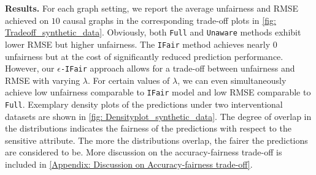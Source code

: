 \documentclass{article} %
\begin{document}
\textbf{Results.} For each graph setting, we report the average unfairness and RMSE achieved on $10$ causal graphs %
in the corresponding trade-off plots in \cref{fig: Tradeoff_synthetic_data}. Obviously, both \texttt{Full} and \texttt{Unaware} methods exhibit lower RMSE but higher unfairness. The \texttt{IFair} method achieves nearly 0 unfairness but at the cost of significantly reduced prediction performance. However, our \texttt{$\epsilon$-IFair} approach allows for a trade-off between unfairness and RMSE with varying $\lambda$. For certain values of $\lambda$, we can even simultaneously achieve low unfairness comparable to \texttt{IFair} model and low RMSE comparable to \texttt{Full}.
Exemplary density plots of the predictions under two interventional datasets are shown in \cref{fig: Densityplot_synthetic_data}. The degree of overlap in the distributions indicates the fairness of the predictions with respect to the sensitive attribute. The more the distributions overlap, the fairer the predictions are considered to be. 
More discussion on the accuracy-fairness trade-off is included in \cref{Appendix: Discussion on Accuracy-fairness trade-off}.


    
\end{document}
